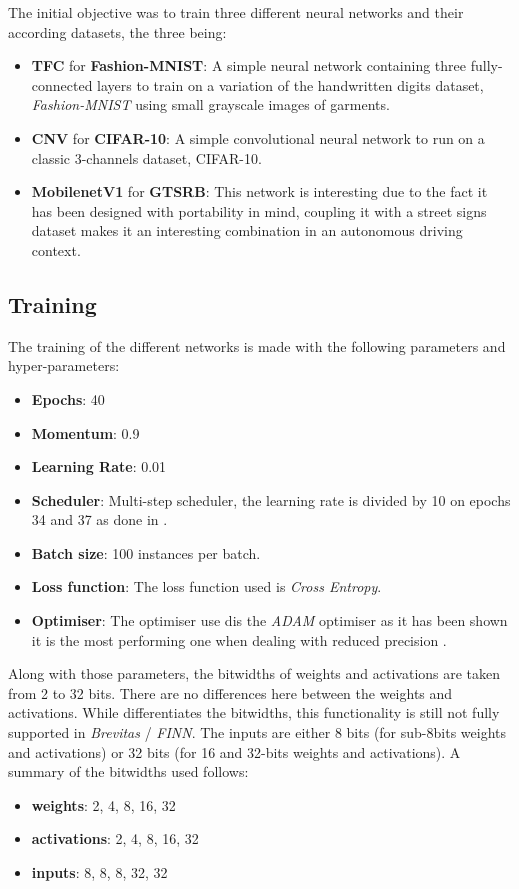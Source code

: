 The initial objective was to train three different neural networks and their according datasets, the three being:
\begin{itemize}
  \item \textbf{TFC} for \textbf{Fashion-MNIST}: A simple neural network containing three fully-connected layers to train on a variation of the handwritten digits dataset, \emph{Fashion-MNIST} using small grayscale images of garments.
  \item \textbf{CNV} for \textbf{CIFAR-10}: A simple convolutional neural network to run on a classic 3-channels dataset, CIFAR-10.
  \item \textbf{MobilenetV1} for \textbf{GTSRB}: This network is interesting due to the fact it has been designed with portability in mind, coupling it with a street signs dataset makes it an interesting combination in an autonomous driving context.
\end{itemize}


\subsection{Training}

The training of the different networks is made with the following parameters and hyper-parameters:
\begin{itemize}
  \item \textbf{Epochs}: 40
  \item \textbf{Momentum}: 0.9
  \item \textbf{Learning Rate}: 0.01
  \item \textbf{Scheduler}: Multi-step scheduler, the learning rate is divided by 10 on epochs 34 and 37 as done in \cite{}.
  \item \textbf{Batch size}: 100 instances per batch.
  \item \textbf{Loss function}: The loss function used is \emph{Cross Entropy}.
  \item \textbf{Optimiser}: The optimiser use dis the \emph{ADAM} optimiser as it has been shown it is the most performing one when dealing with reduced precision \cite{Alizadeh2018}.
\end{itemize}

Along with those parameters, the bitwidths of weights and activations are taken from 2 to 32 bits. There are no differences here between the weights and activations. While \cite{Bacchus2020} differentiates the bitwidths, this functionality is still not fully supported in \emph{Brevitas} / \emph{FINN}. The inputs are either 8 bits (for sub-8bits weights and activations) or 32 bits (for 16 and 32-bits weights and activations). A summary of the bitwidths used follows:
\begin{itemize}
  \item \textbf{weights}: 2, 4, 8, 16, 32
  \item \textbf{activations}: 2, 4, 8, 16, 32
  \item \textbf{inputs}: 8, 8, 8, 32, 32
\end{itemize}

